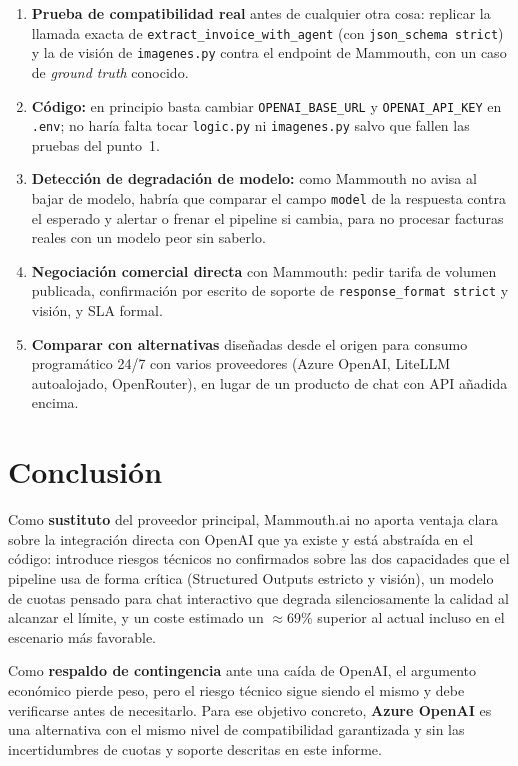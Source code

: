 \documentclass[11pt,a4paper]{article}
\begin{document}
\begin{enumerate}
    \item \textbf{Prueba de compatibilidad real} antes de cualquier otra cosa:
    replicar la llamada exacta de \texttt{extract\_invoice\_with\_agent} (con
    \texttt{json\_schema strict}) y la de visión de \texttt{imagenes.py} contra el
    endpoint de Mammouth, con un caso de \emph{ground truth} conocido.
    \item \textbf{Código:} en principio basta cambiar \texttt{OPENAI\_BASE\_URL} y
    \texttt{OPENAI\_API\_KEY} en \texttt{.env}; no haría falta tocar
    \texttt{logic.py} ni \texttt{imagenes.py} salvo que fallen las pruebas del
    punto~1.
    \item \textbf{Detección de degradación de modelo:} como Mammouth no avisa al
    bajar de modelo, habría que comparar el campo \texttt{model} de la respuesta
    contra el esperado y alertar o frenar el pipeline si cambia, para no procesar
    facturas reales con un modelo peor sin saberlo.
    \item \textbf{Negociación comercial directa} con Mammouth: pedir tarifa de
    volumen publicada, confirmación por escrito de soporte de
    \texttt{response\_format strict} y visión, y SLA formal.
    \item \textbf{Comparar con alternativas} diseñadas desde el origen para
    consumo programático 24/7 con varios proveedores (Azure OpenAI, LiteLLM
    autoalojado, OpenRouter), en lugar de un producto de chat con API añadida
    encima.
\end{enumerate}

\section{Conclusión}

Como \textbf{sustituto} del proveedor principal, Mammouth.ai no aporta ventaja
clara sobre la integración directa con OpenAI que ya existe y está abstraída en
el código: introduce riesgos técnicos no confirmados sobre las dos capacidades
que el pipeline usa de forma crítica (Structured Outputs estricto y visión), un
modelo de cuotas pensado para chat interactivo que degrada silenciosamente la
calidad al alcanzar el límite, y un coste estimado un $\approx$69\% superior al
actual incluso en el escenario más favorable.

Como \textbf{respaldo de contingencia} ante una caída de OpenAI, el argumento
económico pierde peso, pero el riesgo técnico sigue siendo el mismo y debe
verificarse antes de necesitarlo. Para ese objetivo concreto, \textbf{Azure
OpenAI} es una alternativa con el mismo nivel de compatibilidad garantizada y
sin las incertidumbres de cuotas y soporte descritas en este informe.
\end{document}
